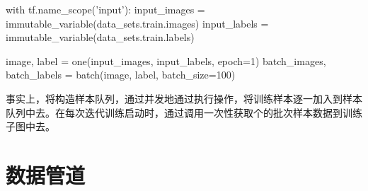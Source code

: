 \begin{content}
\begin{leftbar}
\begin{python}
with tf.name_scope('input'):
  input_images = immutable_variable(data_sets.train.images)
  input_labels = immutable_variable(data_sets.train.labels)

  image, label = one(input_images, input_labels, epoch=1)
  batch_images, batch_labels = batch(image, label, batch_size=100)
\end{python}
\end{leftbar}

事实上，将构造样本队列，通过并发地通过执行操作，将训练样本逐一加入到样本队列中去。在每次迭代训练启动时，通过调用一次性获取个的批次样本数据到训练子图中去。

\end{content}

\section{数据管道}

